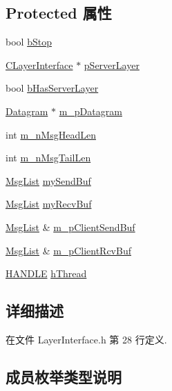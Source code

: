 \subsection*{Protected 属性}
\begin{DoxyCompactItemize}
\item 
bool \hyperlink{class_c_layer_interface_a21292dad42f0048a08a19eeeba0d68cc}{b\+Stop}
\item 
\hyperlink{class_c_layer_interface}{C\+Layer\+Interface} $\ast$ \hyperlink{class_c_layer_interface_a075d83e440db42925a85d17f9e3e9a0b}{p\+Server\+Layer}
\item 
bool \hyperlink{class_c_layer_interface_ab5e0e1580b714b045664a8051373b8f2}{b\+Has\+Server\+Layer}
\item 
\hyperlink{class_datagram}{Datagram} $\ast$ \hyperlink{class_c_layer_interface_a6c3c04e1123c94ff609dafbd2429dfee}{m\+\_\+p\+Datagram}
\item 
int \hyperlink{class_c_layer_interface_a7057ebc9a57429562f4642b5e8586a52}{m\+\_\+n\+Msg\+Head\+Len}
\item 
int \hyperlink{class_c_layer_interface_a6c9d5fd635c29705c2cb9bea7c5a68f5}{m\+\_\+n\+Msg\+Tail\+Len}
\item 
\hyperlink{class_msg_list}{Msg\+List} \hyperlink{class_c_layer_interface_ab85631c424f3a77311ca4532db18d8a6}{my\+Send\+Buf}
\item 
\hyperlink{class_msg_list}{Msg\+List} \hyperlink{class_c_layer_interface_a6b35060c9d58ff2a0f394e1c54301ae8}{my\+Recv\+Buf}
\item 
\hyperlink{class_msg_list}{Msg\+List} \& \hyperlink{class_c_layer_interface_a17da1d50a68115d810b8079f1c6e22d7}{m\+\_\+p\+Client\+Send\+Buf}
\item 
\hyperlink{class_msg_list}{Msg\+List} \& \hyperlink{class_c_layer_interface_af9509b975b79a1c15a5a5523c03eeaaa}{m\+\_\+p\+Client\+Rcv\+Buf}
\item 
\hyperlink{_layer_interface_2_mail_slot_8h_aa8c0374618b33785ccb02f74bcfebc46}{H\+A\+N\+D\+LE} \hyperlink{class_c_layer_interface_a91818359711b0f61e18347707a13ba31}{h\+Thread}
\end{DoxyCompactItemize}


\subsection{详细描述}


在文件 Layer\+Interface.\+h 第 28 行定义.



\subsection{成员枚举类型说明}
\mbox{\label{class_c_layer_interface_a033fd0915604b00e58a68115d414a50a}} 
